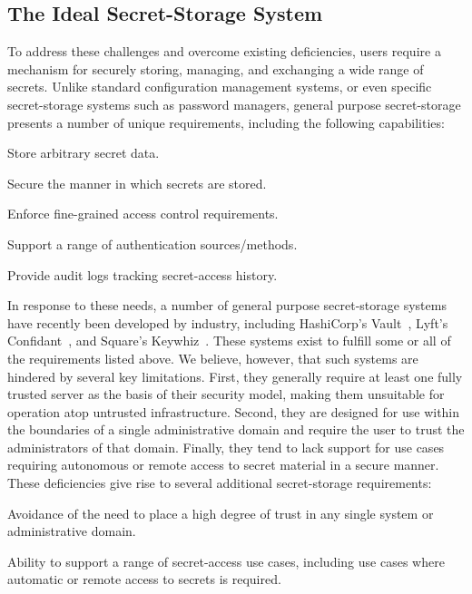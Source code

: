 \subsection{The Ideal Secret-Storage System}

To address these challenges and overcome existing deficiencies, users
require a mechanism for securely storing, managing, and exchanging a
wide range of secrets. Unlike standard configuration management
systems, or even specific secret-storage systems such as password
managers, general purpose secret-storage presents a number of unique
requirements, including the following capabilities:

\begin{packed_item}
\item Store arbitrary secret data.
\item Secure the manner in which secrets are stored.
\item Enforce fine-grained access control requirements.
\item Support a range of authentication sources/methods.
\item Provide audit logs tracking secret-access history.
\end{packed_item}

In response to these needs, a number of general purpose secret-storage
systems have recently been developed by industry, including
HashiCorp's Vault~\cite{vault}, Lyft's Confidant~\cite{confidant}, and
Square's Keywhiz~\cite{keywhiz}. These systems exist to fulfill some
or all of the requirements listed above. We believe, however, that
such systems are hindered by several key limitations. First, they
generally require at least one fully trusted server as the basis of
their security model, making them unsuitable for operation atop
untrusted infrastructure. Second, they are designed for use within the
boundaries of a single administrative domain and require the user to
trust the administrators of that domain. Finally, they tend to lack
support for use cases requiring autonomous or remote access to secret
material in a secure manner. These deficiencies give rise to several
additional secret-storage requirements:

\begin{packed_item}
\item Avoidance of the need to place a high degree of trust in any
  single system or administrative domain.
\item Ability to support a range of secret-access use cases, including
  use cases where automatic or remote access to secrets is required.
\end{packed_item}

